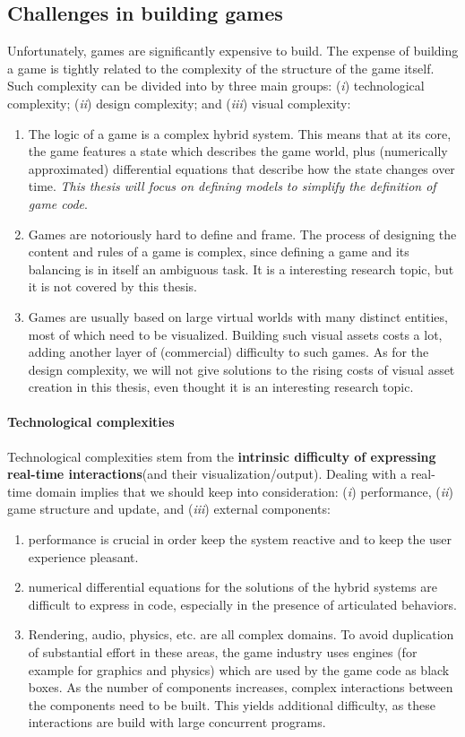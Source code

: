 \documentclass[10pt,a4paper]{article}
\begin{document}
\subsection{Challenges in building games}
Unfortunately, games are significantly expensive to build. The expense of building a game is tightly related to the complexity of the structure of the game itself. Such complexity can be divided into by three main groups: (\textit{i})
technological complexity; (\textit{ii}) design complexity; and (\textit{iii}) visual complexity:
\begin{enumerate}
\item The logic of a game is a complex hybrid system. This means that at its core, the game features a state which describes the game world, plus (numerically approximated) differential equations that describe how the state changes over time. \textit{This thesis will focus on defining models to simplify the definition of game code}.
\item Games are notoriously hard to define and frame. The process of designing the content and rules of a game is complex, since defining a game and its balancing is in itself an ambiguous task. It is a interesting research topic, but it is not covered by this thesis.
\item Games are usually based on large virtual worlds with many distinct entities, most of which need to be visualized. Building such visual assets costs a lot, adding another layer of (commercial) difficulty to such games. As for the design complexity, we will not give solutions to the rising costs of visual asset creation in this thesis, even thought it is
an interesting research topic.
\end{enumerate}

\paragraph{Technological complexities}
Technological complexities stem from the \textbf{intrinsic difficulty of expressing real-time interactions}(and their visualization/output). Dealing with a real-time domain implies that we should keep into consideration: (\textit{i}) performance, (\textit{ii}) game structure and update, and (\textit{iii}) external components:

\begin{enumerate}
\item performance is crucial in order keep the system reactive and to keep the user experience pleasant.
\item numerical differential equations for the solutions of the hybrid systems are difficult to express in code, especially in the presence of articulated behaviors.
\item Rendering, audio, physics, etc. are all complex domains. To avoid duplication of substantial effort in these areas, the game industry uses engines (for example for graphics and physics) which are used by the game code as black boxes. As the number of components increases, complex interactions between the components need to be built. This yields additional difficulty, as these interactions are build with large concurrent programs.
\end{enumerate}
\end{document}

